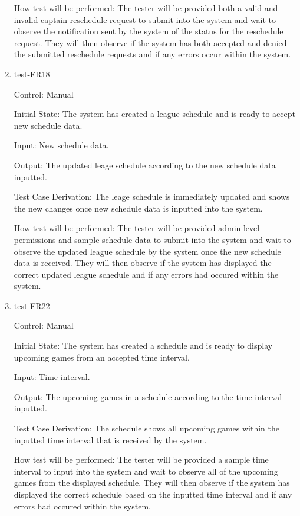 \documentclass[12pt, titlepage]{article}
\begin{document}
\begin{enumerate}
  How test will be performed: The tester will be provided both a valid and invalid captain
  reschedule request to submit into the system and wait to observe the notification sent
  by the system of the status for the reschedule request. They will then observe if the
  system has both accepted and denied the submitted reschedule requests and if any errors
  occur within the system. 

  \item{test-FR18\\}

  Control: Manual
            
  Initial State: The system has created a league schedule and is ready to
  accept new schedule data.
            
  Input: New schedule data.
            
  Output: The updated leage schedule according to the new schedule data inputted.

  Test Case Derivation: The leage schedule is immediately updated and shows the new changes
  once new schedule data is inputted into the system.
            
  How test will be performed: The tester will be provided admin level permissions and sample
  schedule data to submit into the system and wait to observe the updated league schedule
  by the system once the new schedule data is received. They will then observe if the
  system has displayed the correct updated league schedule and if any errors had
  occured within the system. 

  \item{test-FR22\\}

  Control: Manual
            
  Initial State: The system has created a schedule and is ready to display upcoming games from
  an accepted time interval.
            
  Input: Time interval.
            
  Output: The upcoming games in a schedule according to the time interval inputted.

  Test Case Derivation: The schedule shows all upcoming games within the inputted time interval
  that is received by the system.
            
  How test will be performed: The tester will be provided a sample time interval to input
  into the system and wait to observe all of the upcoming games from the displayed schedule.
  They will then observe if the system has displayed the correct schedule based on the
  inputted time interval and if any errors had occured within the system. 

\end{enumerate}
\end{document}

